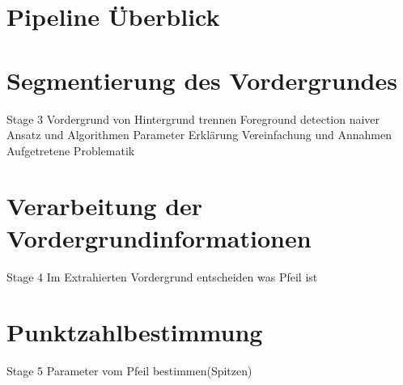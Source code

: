\section{Pipeline Überblick}
\label{sec:pipeline}
\section{Segmentierung des Vordergrundes}
\label{sec:segmentation}
Stage 3 Vordergrund von Hintergrund trennen
Foreground detection naiver Ansatz und Algorithmen
Parameter Erklärung
Vereinfachung und Annahmen
Aufgetretene Problematik
\section{Verarbeitung der Vordergrundinformationen}
\label{sec:foreground}
Stage 4 Im Extrahierten Vordergrund entscheiden was Pfeil ist
\section{Punktzahlbestimmung}
\label{sec:score}
Stage 5 Parameter vom Pfeil bestimmen(Spitzen)

